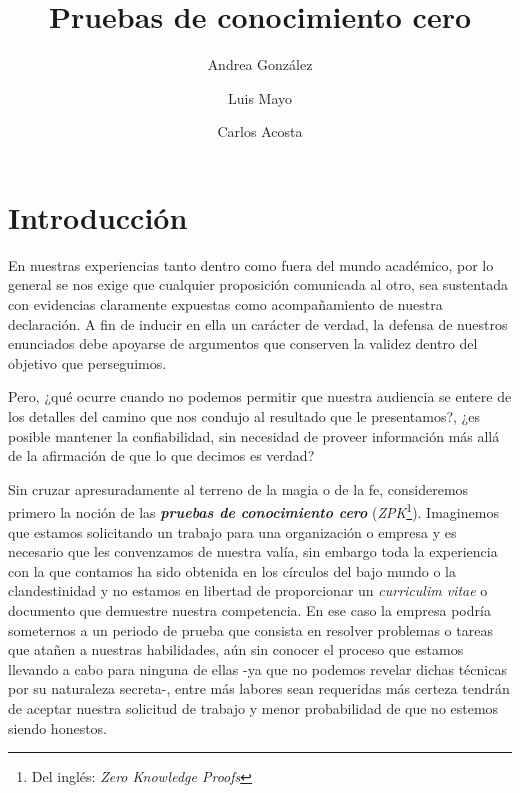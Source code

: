 \documentclass[oneside,10pt]{article}
\begin{document}
\author{Andrea González \and Luis Mayo \and Carlos Acosta}
\title{Pruebas de conocimiento cero}
\maketitle

\tableofcontents
\newpage 

\section{Introducción}
En nuestras experiencias tanto dentro como fuera del mundo académico,
por lo general se nos exige  que
cualquier proposición comunicada al otro, sea sustentada con evidencias
claramente expuestas como acompañamiento de nuestra declaración. A fin de
inducir en ella un carácter de verdad, la defensa de nuestros enunciados
debe apoyarse de argumentos que conserven la validez dentro del objetivo que
perseguimos.

Pero, ¿qué ocurre cuando
no podemos permitir que nuestra audiencia se entere de los detalles
del camino que nos condujo al resultado que le presentamos?, ¿es posible
mantener la confiabilidad, sin necesidad de proveer información más allá
de la afirmación de que lo que decimos es verdad?

Sin cruzar apresuradamente al terreno de la magia o de la fe, consideremos primero
la noción de las \textit{\textbf{pruebas de conocimiento cero}} (\textit{ZPK}\footnote{Del inglés: \textit{Zero Knowledge Proofs}}).
Imaginemos que estamos solicitando un trabajo para una organización o empresa y es
necesario que les convenzamos de nuestra valía, sin embargo toda la experiencia con
la que contamos ha sido obtenida en los círculos del bajo mundo o la clandestinidad y no
estamos en libertad de proporcionar un \textit{curriculim vitae} o documento que demuestre nuestra
competencia. En ese caso la empresa podría someternos a un periodo de prueba que consista en
resolver problemas o tareas que atañen a nuestras habilidades, aún sin conocer el proceso
que estamos llevando a cabo para ninguna de ellas -ya que no podemos revelar dichas técnicas por su
naturaleza secreta-, entre más labores sean requeridas
más certeza tendrán de aceptar nuestra solicitud de trabajo y menor probabilidad de que no estemos
siendo honestos.
\end{document}
